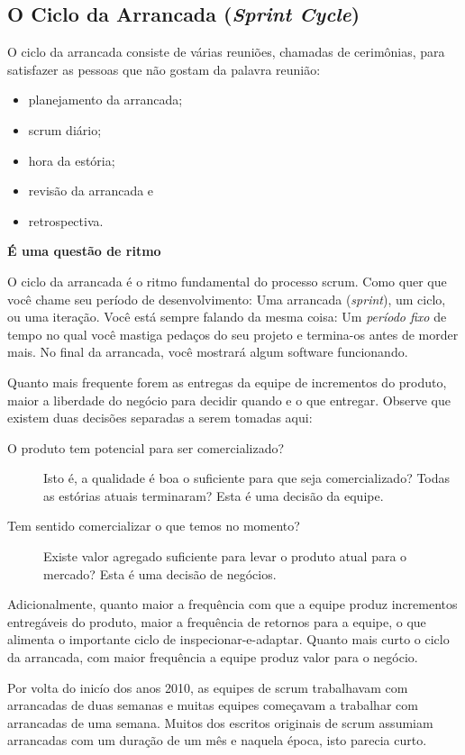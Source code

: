 \documentclass[
	11pt,				%
	openright,
	twoside,			%
	a4paper,			%
	english,			%
	french,
	brazil,				%
	sumario=tradicional
	]{abntex2}
\begin{document}
\subsection{O Ciclo da Arrancada (\textit{Sprint Cycle})}

O ciclo da arrancada consiste de várias reuniões, chamadas de cerimônias, para satisfazer as pessoas que não gostam da palavra reunião:
\begin{itemize}
\item planejamento da arrancada;
\item scrum diário;
\item hora da estória;
\item revisão da arrancada e
\item retrospectiva.
\end{itemize}

\noindent \textbf{É uma questão de ritmo}

O ciclo da arrancada é o ritmo fundamental do processo scrum. Como quer que você chame seu período de desenvolvimento: Uma arrancada (\emph{sprint}), um ciclo, ou uma iteração. Você está sempre falando da mesma coisa: Um \emph{período fixo} de tempo no qual você mastiga pedaços do seu projeto e termina-os antes de morder mais. No final da arrancada, você mostrará algum software funcionando.

Quanto mais frequente forem as entregas da equipe de incrementos do produto, maior a liberdade do negócio para decidir quando e o que entregar. Observe que existem duas decisões separadas a serem tomadas aqui:

\begin{description}
\item[O produto tem potencial para ser comercializado?] Isto é, a qualidade é boa o suficiente para que seja comercializado? Todas as estórias atuais terminaram? Esta é uma decisão da equipe.
\item[Tem sentido comercializar o que temos no momento?] Existe valor agregado suficiente para levar o produto atual para o mercado? Esta é uma decisão de negócios.
\end{description}

Adicionalmente, quanto maior a frequência com que a equipe produz incrementos entregáveis do produto, maior a frequência de retornos para a equipe, o que alimenta o importante ciclo de inspecionar-e-adaptar. Quanto mais curto o ciclo da arrancada, com maior frequência a equipe produz valor para o negócio.

Por volta do inicío dos anos 2010, as equipes de scrum trabalhavam com arrancadas de duas semanas e muitas equipes começavam a trabalhar com arrancadas de uma semana. Muitos dos escritos originais de scrum assumiam arrancadas com um duração de um mês e naquela época, isto parecia curto.
\end{document}
